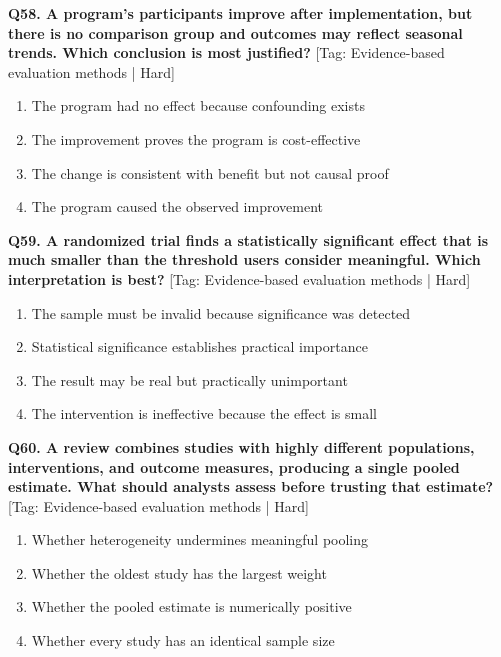 \noindent\textbf{Q58. A program's participants improve after implementation, but there is no comparison group and outcomes may reflect seasonal trends. Which conclusion is most justified?} \hfill [Tag: Evidence-based evaluation methods | Hard]
\begin{enumerate}[label=(\alph*),topsep=2pt,itemsep=1pt,partopsep=0pt,parsep=0pt]
    \item {The program had no effect because confounding exists}
    \item {The improvement proves the program is cost-effective}
    \item {The change is consistent with benefit but not causal proof}
    \item {The program caused the observed improvement}
\end{enumerate}
\vspace{2mm}

\noindent\textbf{Q59. A randomized trial finds a statistically significant effect that is much smaller than the threshold users consider meaningful. Which interpretation is best?} \hfill [Tag: Evidence-based evaluation methods | Hard]
\begin{enumerate}[label=(\alph*),topsep=2pt,itemsep=1pt,partopsep=0pt,parsep=0pt]
    \item {The sample must be invalid because significance was detected}
    \item {Statistical significance establishes practical importance}
    \item {The result may be real but practically unimportant}
    \item {The intervention is ineffective because the effect is small}
\end{enumerate}
\vspace{2mm}

\noindent\textbf{Q60. A review combines studies with highly different populations, interventions, and outcome measures, producing a single pooled estimate. What should analysts assess before trusting that estimate?} \hfill [Tag: Evidence-based evaluation methods | Hard]
\begin{enumerate}[label=(\alph*),topsep=2pt,itemsep=1pt,partopsep=0pt,parsep=0pt]
    \item {Whether heterogeneity undermines meaningful pooling}
    \item {Whether the oldest study has the largest weight}
    \item {Whether the pooled estimate is numerically positive}
    \item {Whether every study has an identical sample size}
\end{enumerate}
\vspace{2mm}



